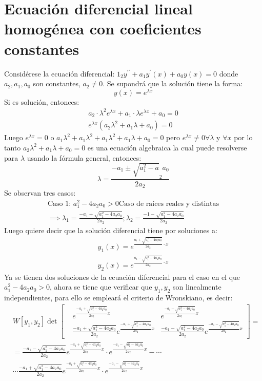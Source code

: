 \section{Ecuación diferencial lineal homogénea con coeficientes constantes}
Considérese la ecuación diferencial: $1_2y^{\prime\prime}+a_1y^{\prime}(x)+a_0y(x)=0$
donde $a_2,a_1,a_0$ son constantes, $a_2\neq 0$. Se supondrá que la solución tiene la forma:
\begin{equation*}
    y(x) = e^{\lambda x}
\end{equation*}
Si es solución, entonces:
\begin{align*}
    a_2\cdot \lambda^2 e^{\lambda x} + a_1\cdot \lambda e^{\lambda x} + a_0 = 0\\
    e^{\lambda x}\left(a_2\lambda^2 + a_1\lambda + a_0\right) = 0
\end{align*}
Luego $e^{\lambda x}=0$ o $a_1\lambda^2+a_1\lambda^2+a_1\lambda^2+a_1\lambda+a_0=0$
pero $e^{\lambda x}\neq 0\forall \lambda$ y $\forall x$ por lo tanto $a_2\lambda^2+a_1\lambda+a_0=0$ es una ecuación algebraica la cual puede resolverse para $\lambda$ usando la fórmula general, entonces:
\begin{equation*}
    \lambda = \frac{ - a_1 \pm \sqrt{a_1^2 - a}_2a_0}{2a_2}
\end{equation*}
Se observan tres casos:
\begin{align*}
    \text{Caso 1: } a_1^2 - 4a_2a_0 > 0 \text{Caso de raíces reales y distintas}\\
    \implies \lambda_1 = \frac{ - a_1 + \sqrt{a_1^2 - 4a_2a_0}}{2a_2}; \lambda_2 = \frac{ - 1 - \sqrt{a_1^2 - 4a_2a_0}}{2a_2}
\end{align*}
Luego quiere decir que la solución diferencial tiene por soluciones a:
\begin{align*}
    y_1(x) = e^{\frac{ a_1 + \sqrt{a_1^2 - 4a_2a_0}}{2a_2}\cdot x}\\
    y_2(x) = e^{\frac{ a_1 - \sqrt{a_1^2 - 4a_2a_0}}{2a_2}\cdot x}
\end{align*}
Ya se tienen dos soluciones de la ecuación diferencial para el caso en el que $a_1^2-4a_2a_0>0$, ahora se tiene que verificar que $y_1,y_2$ son linealmente independientes, para ello se empleará el criterio de Wronskiano, es decir:
\begin{align*}
    &W\left[ y_1,y_2 \right] \det \begin{bmatrix}
        &e^{\frac{ - a_1 + \sqrt{a_1^2 - 4a_2a_0}}{2a_2}x}& e^{\frac{ - a_1 - \sqrt{a_1^2 - 4a_2a_0}}{2a_2}x}\\ 
        &\frac{ - a_1 + \sqrt{a_1^2 - 4a_2a_0}}{2a_2}e^{\frac{ - a_1 + \sqrt{a_1^2 - 4a_2a_0}}{2a_2}x}&\frac{ - a_1 - \sqrt{a_1^2 - 4a_2a_0}}{2a_2}e^{\frac{ - a_1 - \sqrt{a_1^2 - 4a_2a_0}}{2a_2}x}
    \end{bmatrix} =\\
    &=\frac{ - a_1 - \sqrt{a_1^2 - 4a_2a_0}}{2a_2}e^{\frac{ - a_1 + \sqrt{a_1^2 - 4a_2a_0}}{2a_2}x}\cdot e^{\frac{ - a_1 - \sqrt{a_1^2 - 4a_2a_0}}{2a_2}x} -\cdots\\
    &\cdots \frac{ - a_1 + \sqrt{a_1^2 - 4a_2a_0}}{2a_2}e^{\frac{ - a_1 + \sqrt{a_1^2 - 4a_2a_0}}{2a_2}x}\cdot e^{\frac{ - a_1 - \sqrt{a_1^2 - 4a_2a_0}}{2a_2}x}
\end{align*}
